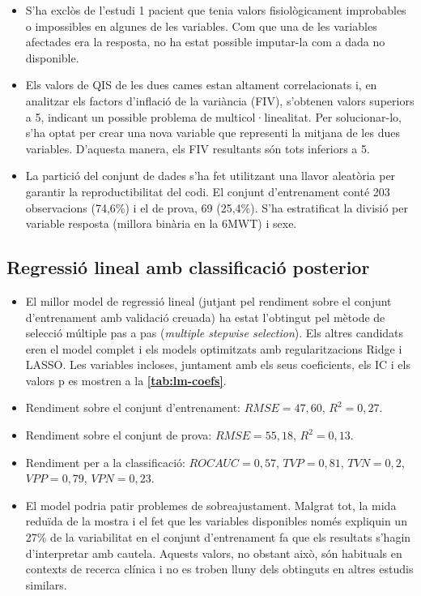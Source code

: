 \documentclass[CAT]{TFUOC}%
\begin{document}
\begin{itemize}
\item
  S'ha exclòs de l'estudi 1 pacient que tenia valors fisiològicament improbables o impossibles en algunes de les variables. Com que una de les variables afectades era la resposta, no ha estat possible imputar-la com a dada no disponible.
\item
  Els valors de QIS de les dues cames estan altament correlacionats i, en analitzar els factors d'inflació de la variància (FIV), s'obtenen valors superiors a 5, indicant un possible problema de multicol·linealitat. Per solucionar-lo, s'ha optat per crear una nova variable que representi la mitjana de les dues variables. D'aquesta manera, els FIV resultants són tots inferiors a 5.
\item
  La partició del conjunt de dades s'ha fet utilitzant una llavor aleatòria per garantir la reproductibilitat del codi. El conjunt d'entrenament conté 203 observacions (74,6\%) i el de prova, 69 (25,4\%). S'ha estratificat la divisió per variable resposta (millora binària en la 6MWT) i sexe.
\end{itemize}

\subsection{Regressió lineal amb classificació posterior}\label{regressiuxf3-lineal-amb-classificaciuxf3-posterior}

\begin{itemize}
\item
  El millor model de regressió lineal (jutjant pel rendiment sobre el conjunt d'entrenament amb validació creuada) ha estat l'obtingut pel mètode de selecció múltiple pas a pas (\emph{multiple stepwise selection}). Els altres candidats eren el model complet i els models optimitzats amb regularitzacions Ridge i LASSO. Les variables incloses, juntament amb els seus coeficients, els IC i els valors p es mostren a la \textbf{\autoref{tab:lm-coefs}}.
\item
  Rendiment sobre el conjunt d'entrenament: \(RMSE = 47,60\), \(R^2 = 0,27\).
\item
  Rendiment sobre el conjunt de prova: \(RMSE = 55,18\), \(R^2 = 0,13\).
\item
  Rendiment per a la classificació: \(ROC AUC = 0,57\), \(TVP = 0,81\), \(TVN = 0,2\), \(VPP = 0,79\), \(VPN = 0,23\).
\item
  El model podria patir problemes de sobreajustament. Malgrat tot, la mida reduïda de la mostra i el fet que les variables disponibles només expliquin un 27\% de la variabilitat en el conjunt d'entrenament fa que els resultats s'hagin d'interpretar amb cautela. Aquests valors, no obstant això, són habituals en contexts de recerca clínica i no es troben lluny dels obtinguts en altres estudis similars.
\end{itemize}
\end{document}
